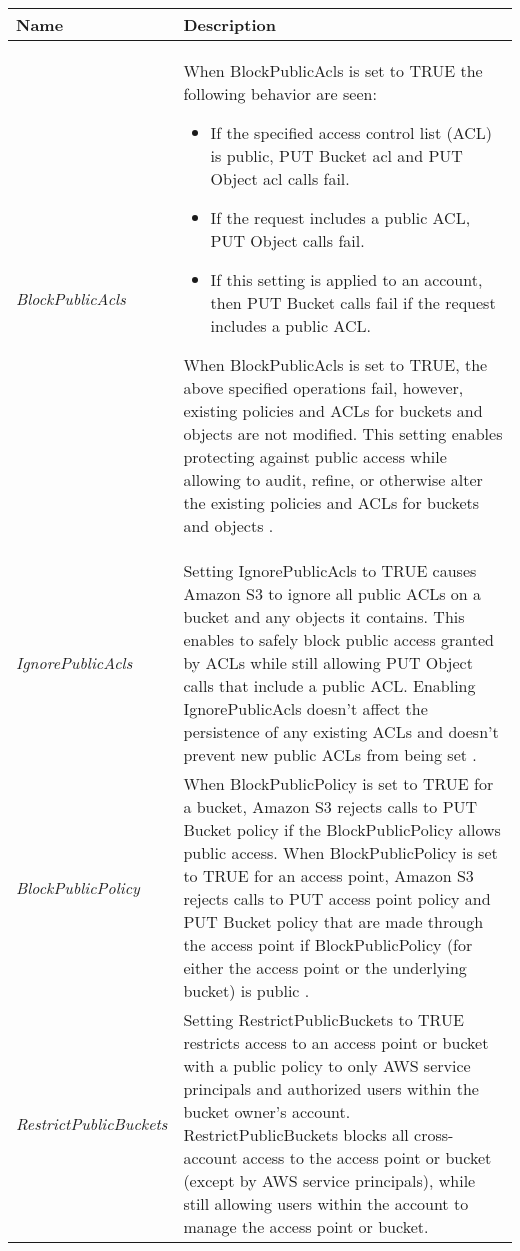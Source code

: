 {\clearpage

\begin{longtable}{|p{5cm}|p{11.4cm}|}
    \hline
    \textbf{Name} & \textbf{Description} \\
    \hline
    \textit{BlockPublicAcls} & When BlockPublicAcls is set to TRUE the following behavior are seen:
    \begin{itemize}
        \item If the specified access control list (ACL) is public, PUT Bucket acl and PUT Object acl calls fail.
    \end{itemize}

    \begin{itemize}
        \item If the request includes a public ACL, PUT Object calls fail.
    \end{itemize}

    \begin{itemize}
        \item If this setting is applied to an account, then PUT Bucket calls fail if the request includes a public ACL.
    \end{itemize}
    \par When BlockPublicAcls is set to TRUE, the above specified operations fail, however, existing policies and ACLs for buckets and objects are not modified. This setting enables protecting against public access while allowing to audit, refine, or otherwise alter the existing policies and ACLs for buckets and objects \cite{23}.
    \\
    \hline
    \textit{IgnorePublicAcls} & Setting IgnorePublicAcls to TRUE causes Amazon S3 to ignore all public ACLs on a bucket and any objects it contains. This enables to safely block public access granted by ACLs while still allowing PUT Object calls that include a public ACL. Enabling IgnorePublicAcls doesn't affect the persistence of any existing ACLs and doesn't prevent new public ACLs from being set \cite{23}.  \\
    \hline
    \textit{BlockPublicPolicy} & When BlockPublicPolicy is set to TRUE for a bucket, Amazon S3 rejects calls to PUT Bucket policy if the BlockPublicPolicy allows public access. When BlockPublicPolicy is set to TRUE for an access point, Amazon S3 rejects calls to PUT access point policy and PUT Bucket policy that are made through the access point if BlockPublicPolicy (for either the access point or the underlying bucket) is public \cite{23}.  \\
    \hline
    \textit{RestrictPublicBuckets} & Setting RestrictPublicBuckets to TRUE restricts access to an access point or bucket with a public policy to only AWS service principals and authorized users within the bucket owner's account.  RestrictPublicBuckets blocks all cross-account access to the access point or bucket (except by AWS service principals), while still allowing users within the account to manage the access point or bucket.


\end{longtable}}
